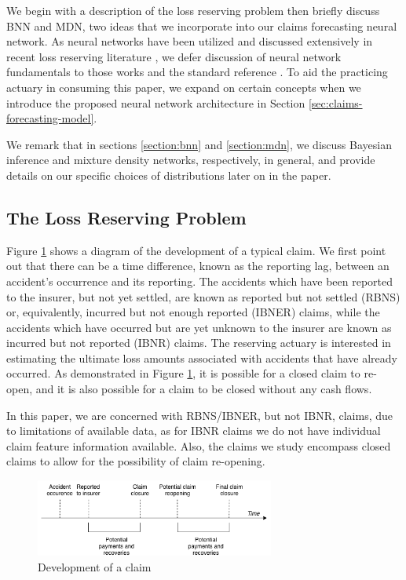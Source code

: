 \documentclass{article}
\begin{document}
We begin with a description of the loss reserving problem then briefly discuss 
BNN and MDN, two ideas that we incorporate into our claims forecasting neural 
network. As neural networks have been utilized and discussed extensively in 
recent loss reserving literature \cite{gabrielliNeuralNetwork2019a, 
gabrielliNeuralNetwork2019, kuo2019deeptriangle, wuthrichNeuralNetworks2018,
gabrielliIndividualClaims2018}, we defer discussion of neural network 
fundamentals to those works and the standard reference
\cite{goodfellowDeepLearning2016}. To aid the practicing actuary in consuming 
this paper, we expand on certain concepts when we introduce the proposed neural 
network architecture in Section \ref{sec:claims-forecasting-model}.

We remark that in sections \ref{section:bnn} and \ref{section:mdn}, we discuss 
Bayesian inference and mixture density networks, respectively, in general, and 
provide details on our specific choices of distributions later on in the paper.

\subsection{The Loss Reserving Problem}

Figure \ref{fig:claimrunoff} shows a diagram of the development of a typical
claim. We first point out that there can be a time difference, known as the 
reporting lag, between an accident's occurrence and its reporting. The accidents
which have been reported to the insurer, but not yet settled, are known as 
reported but not settled (RBNS) or, equivalently, incurred but not enough 
reported (IBNER) claims, while the accidents which have occurred but are yet
unknown to the insurer are known as incurred but not reported (IBNR) claims. The
reserving actuary is interested in estimating the ultimate loss amounts 
associated with accidents that have already occurred. As demonstrated in Figure
\ref{fig:claimrunoff}, it is possible for a closed claim to re-open, and it is
also possible for a claim to be closed without any cash flows.

In this paper, we are concerned with RBNS/IBNER, but not IBNR, claims, due to 
limitations of available data, as for IBNR claims we do not have individual 
claim feature information available. Also, the claims we study encompass closed 
claims to allow for the possibility of claim re-opening.

\begin{figure}
  \begin{center}
    \includegraphics[width=0.7\textwidth]{images/claim_runoff.png}
  \end{center}
  \caption{Development of a claim}
  \label{fig:claimrunoff}
\end{figure}
\end{document}
